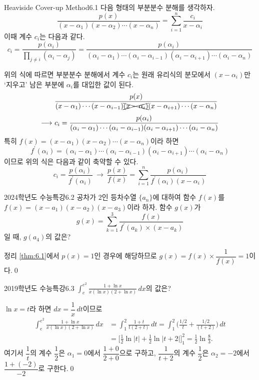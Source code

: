 \documentclass{article}
\begin{document}
\begin{thm}{Heaviside Cover-up Method}{6.1}
	다음 형태의 부분분수 분해를 생각하자.
	\[
		\frac{p(x)}{(x-\alpha_1)(x-\alpha_2)\cdots(x-\alpha_n)}=\sum_{i=1}^n\frac{c_i}{x-\alpha_i}
	\]
	이때 계수 $c_i$는 다음과 같다.
	\[
		c_i=\frac{p(\alpha_i)}{\prod\limits_{j\ne i}(\alpha_i-\alpha_j)}=\frac{p(\alpha_i)}{(\alpha_i-\alpha_1)\cdots(\alpha_i-\alpha_{i-1})(\alpha_i-\alpha_{i+1})\cdots(\alpha_i-\alpha_n)}
	\]
\end{thm}

위의 식에 따르면 부분분수 분해에서 계수 $c_i$는 원래 유리식의 분모에서 $(x-\alpha_i)$만 ‘지우고’ 남은 부분에 $\alpha_i$를 대입한 값이 된다.
\begin{align*}
	&\frac{p(x)}{(x-\alpha_1)\cdots(x-\alpha_{i-1})\xcancel{(x-\alpha_i)}(x-\alpha_{i+1})\cdots(x-\alpha_n)}\\[3pt]
	\longrightarrow~&c_i=\frac{p(\alpha_i)}{(\alpha_i-\alpha_1)\cdots(\alpha_i-\alpha_{i-1})(\alpha_i-\alpha_{i+1})\cdots(\alpha_i-\alpha_n)}
\end{align*}
특히 $f(x)=(x-\alpha_1)(x-\alpha_2)\cdots(x-\alpha_n)$이라 하면
\[
	f^{\prime}(\alpha_i)=(\alpha_i-\alpha_1)\cdots(\alpha_i-\alpha_{i-1})(\alpha_i-\alpha_{i+1})\cdots(\alpha_i-\alpha_n)
\]
이므로 위의 식은 다음과 같이 축약할 수 있다.
\[
	c_i=\frac{p(\alpha_i)}{f^{\prime}(\alpha_i)}~\longrightarrow~\frac{p(x)}{f(x)}=\sum_{i=1}^n\frac{p(\alpha_i)}{f^{\prime}(\alpha_i)(x-\alpha_i)}
\]

\begin{exc}{2024학년도 수능특강}{6.2}
	공차가 $2$인 등차수열 $\{a_n\}$에 대하여 함수 $f(x)$를 $f(x)=(x-a_1)(x-a_2)(x-a_3)$이라 하자. 함수 $g(x)$가
	\[
		g(x)=\sum_{k=1}^3\frac{f(x)}{f^{\prime}(a_k)\times(x-a_k)}
	\]
	일 때, $g(a_4)$의 값은?
\end{exc}

\begin{sol}
	정리 \ref{thm:6.1}에서 $p(x)=1$인 경우에 해당하므로 $g(x)=f(x)\times\dfrac{1}{f(x)}=1$이다.\qed
\end{sol}

\begin{exc}{2019학년도 수능특강}{6.3}
	$\displaystyle\int_e^{e^2}\frac{1+\ln x}{x(\ln x)(2+\ln x)}\,dx$의 값은?
\end{exc}

\begin{sol}
	$\ln x=t$라 하면 $dx=\dfrac{1}{x}\,dt$이므로
	\begin{align*}
		\int_e^{e^2}\frac{1+\ln x}{x(\ln x)(2+\ln x)}\,dx&=\int_1^2\frac{1+t}{t(2+t)}\,dt=\int_1^2\biggl(\frac{1/2}{t}+\frac{1/2}{(t+2)}\biggr)\,dt\\[3pt]
		&=\biggl[\frac{1}{2}\ln\vert t\vert +\frac{1}{2}\ln\vert t+2\vert\biggr]_1^2=\frac{1}{2}\ln\frac{8}{3}.
	\end{align*}
	여기서 $\dfrac{1}{t}$의 계수 $\dfrac{1}{2}$은 $\alpha_1=0$에서 $\dfrac{1+0}{2+0}$으로 구하고, $\dfrac{1}{t+2}$의 계수 $\dfrac{1}{2}$은 $\alpha_2=-2$에서 $\dfrac{1+(-2)}{-2}$로 구한다.\qed
\end{sol}
\end{document}
